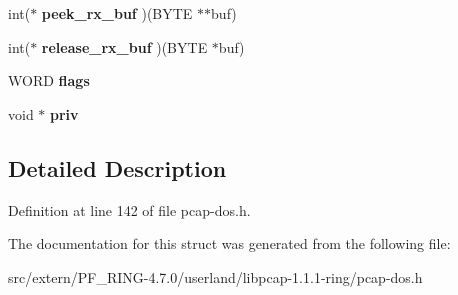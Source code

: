 \begin{DoxyCompactItemize}
\item 
\hypertarget{structdevice_a2d4ec52f58e36ad8c81766693b1f53aa}{
int($\ast$ {\bfseries peek\_\-rx\_\-buf} )(BYTE $\ast$$\ast$buf)}
\label{structdevice_a2d4ec52f58e36ad8c81766693b1f53aa}

\item 
\hypertarget{structdevice_af35bc95c5a3ff23fc646fc731045b383}{
int($\ast$ {\bfseries release\_\-rx\_\-buf} )(BYTE $\ast$buf)}
\label{structdevice_af35bc95c5a3ff23fc646fc731045b383}

\item 
\hypertarget{structdevice_a2e23f9488a62b514e73d2720f1b6ab20}{
WORD {\bfseries flags}}
\label{structdevice_a2e23f9488a62b514e73d2720f1b6ab20}

\item 
\hypertarget{structdevice_a40b3a7f45f84d57f35677490ffe9a7b9}{
void $\ast$ {\bfseries priv}}
\label{structdevice_a40b3a7f45f84d57f35677490ffe9a7b9}

\end{DoxyCompactItemize}


\subsection{Detailed Description}


Definition at line 142 of file pcap-\/dos.h.



The documentation for this struct was generated from the following file:\begin{DoxyCompactItemize}
\item 
src/extern/PF\_\-RING-\/4.7.0/userland/libpcap-\/1.1.1-\/ring/pcap-\/dos.h\end{DoxyCompactItemize}
